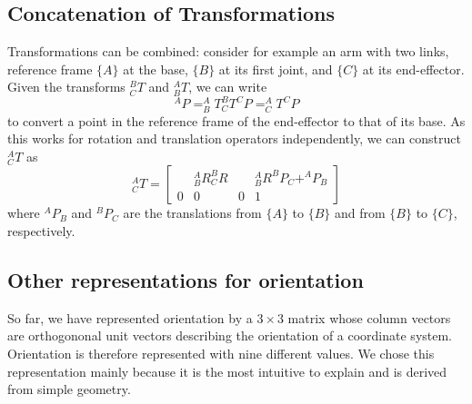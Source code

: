 \subsection{Concatenation of Transformations}\label{sec:kinematics:coordsystems:concatenation}

Transformations can be combined: consider for example an arm with two links, reference frame $\{A\}$ at the base, $ \{B\} $ at its first joint, and $\{C\}$ at its end-effector. Given the transforms $ ^B_CT$ and $ ^A_BT$, we can write
\begin{equation}
^AP=^A_BT^B_CT^CP=^A_CT^CP
\end{equation}
to convert a point in the reference frame of the end-effector to that of its base. As this works for rotation and translation operators independently, we can construct $ ^A_CT$ as
\begin{equation}
^A_CT=\left[\begin{array}{ccc|c} & ^A_BR^B_CR & & ^A_BR^BP_C +^AP_B \\\hline 0 & 0 & 0 & 1\end{array}\right]
\end{equation}
%
where $ ^AP_B$ and $ ^BP_C$ are the translations from $\{A\}$ to $\{B\}$ and from $ \{B\}$ to $\{C\}$, respectively.

\subsection{Other representations for orientation}

So far, we have represented orientation by a $3\times3$ matrix whose column vectors are orthogononal unit vectors describing the orientation of a coordinate system. Orientation is therefore represented with nine different values. We chose this representation mainly because it is the most intuitive to explain and is derived from simple geometry.

